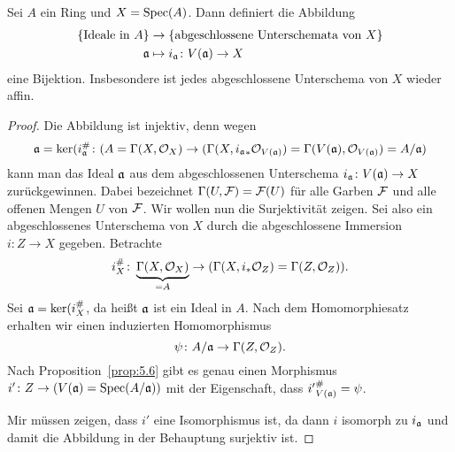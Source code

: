 \begin{thm}
\label{thm:7.5}
	Sei $A$ ein Ring und $X=\operatorname{Spec}(A)$. Dann definiert die Abbildung
	\begin{align*}
		\{\text{Ideale in }A\}&\to \{\text{abgeschlossene Unterschemata von }X\}\\
		\mathfrak{a} &\mapsto i_{\mathfrak{a}}\colon V(\mathfrak{a}) \to X
	\end{align*}
	eine Bijektion. Insbesondere ist jedes abgeschlossene Unterschema von $X$ wieder affin.
	\begin{proof}
		Die Abbildung ist injektiv, denn wegen
		\[
			\mathfrak{a} = \ker(i^{\#}_{\mathfrak{a}}\colon (A = \Gamma(X,\mathcal{O}_X) \to (\Gamma(X,{i_{\mathfrak{a}}}_*\mathcal{O}_{V(\mathfrak{a})}) = \Gamma(V(\mathfrak{a}),\mathcal{O}_{V(\mathfrak{a})}) = A/\mathfrak{a})
		\]
		kann man das Ideal $\mathfrak{a}$ aus dem abgeschlossenen Unterschema $i_{\mathfrak{a}} \colon V(\mathfrak{a}) \to X$ zurückgewinnen. Dabei bezeichnet $\Gamma(U,\mathcal{F}) = \mathcal{F}(U)$ für alle Garben $\mathcal{F}$ und alle offenen Mengen $U$ von $\mathcal{F}$. Wir wollen nun die Surjektivität zeigen. Sei also ein abgeschlossenes Unterschema von $X$ durch die abgeschlossene Immersion $i \colon Z \to X$ gegeben. Betrachte
		\[
			i_X^{\#}\colon \underbrace{\Gamma(X,\mathcal{O}_X)}_{=A} \to (\Gamma(X,i_*\mathcal{O}_Z) = \Gamma(Z,\mathcal{O}_Z)).
		\]
		Sei $\mathfrak{a} = \ker(i_X^{\#}$, da heißt $\mathfrak{a}$ ist ein Ideal in $A$. Nach dem Homomorphiesatz erhalten wir einen induzierten Homomorphismus
		\[
			\psi \colon A/\mathfrak{a} \to \Gamma(Z,\mathcal{O}_Z).
		\]
		Nach Proposition~\ref{prop:5.6} gibt es genau einen Morphismus $i'\colon Z \to (V(\mathfrak{a}) = \operatorname{Spec}(A/\mathfrak{a}))$ mit der Eigenschaft, dass ${i'}^{\#}_{V(\mathfrak{a})} = \psi$.
		\begin{center}
		\end{center}
		Mir müssen zeigen, dass $i'$ eine Isomorphismus ist, da dann $i$ isomorph zu $i_{\mathfrak{a}}$ und damit die Abbildung in der Behauptung surjektiv ist.


\end{proof}
\end{thm}
